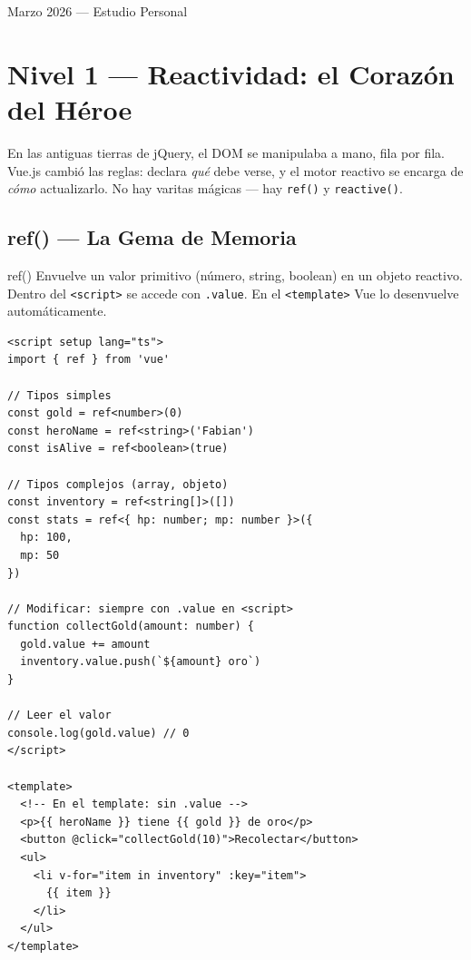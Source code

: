 \documentclass[11pt,a4paper]{article}
\begin{document}
\begin{titlepage}
  \vfill
  {\small\color{gray} Marzo 2026 — Estudio Personal\par}
\end{titlepage}

\tableofcontents
\newpage

\section{Nivel 1 — Reactividad: el Corazón del Héroe}

\begin{lore}
En las antiguas tierras de jQuery, el DOM se manipulaba a mano, fila por fila.
Vue.js cambió las reglas: declara \textit{qué} debe verse, y el motor reactivo
se encarga de \textit{cómo} actualizarlo. No hay varitas mágicas --- hay
\texttt{ref()} y \texttt{reactive()}.
\end{lore}

\subsection{ref() — La Gema de Memoria}

\begin{hechizo}{ref()}
Envuelve un valor primitivo (número, string, boolean) en un objeto reactivo.
Dentro del \texttt{<script>} se accede con \texttt{.value}.
En el \texttt{<template>} Vue lo desenvuelve automáticamente.
\end{hechizo}

\begin{pergamino}
\begin{lstlisting}[style=vue]
<script setup lang="ts">
import { ref } from 'vue'

// Tipos simples
const gold = ref<number>(0)
const heroName = ref<string>('Fabian')
const isAlive = ref<boolean>(true)

// Tipos complejos (array, objeto)
const inventory = ref<string[]>([])
const stats = ref<{ hp: number; mp: number }>({
  hp: 100,
  mp: 50
})

// Modificar: siempre con .value en <script>
function collectGold(amount: number) {
  gold.value += amount
  inventory.value.push(`${amount} oro`)
}

// Leer el valor
console.log(gold.value) // 0
</script>

<template>
  <!-- En el template: sin .value -->
  <p>{{ heroName }} tiene {{ gold }} de oro</p>
  <button @click="collectGold(10)">Recolectar</button>
  <ul>
    <li v-for="item in inventory" :key="item">
      {{ item }}
    </li>
  </ul>
</template>
\end{lstlisting}
\end{pergamino}
\end{document}
